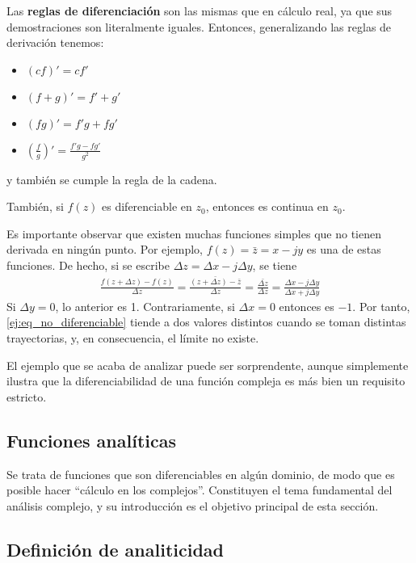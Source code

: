 Las \textbf{reglas de diferenciación} son las mismas que en cálculo real, ya que sus demostraciones son literalmente iguales. Entonces, generalizando las reglas de derivación tenemos:
\begin{itemize}
  \item $(cf)'=cf'$ 
  \item $(f+g)'=f'+g'$
  \item $(fg)'=f'g+fg'$
  \item $\left(\frac{f}{g}\right)'=\frac{f'g-fg'}{g^2}$
\end{itemize}
y también se cumple la regla de la cadena.

También, si $f(z)$ es diferenciable en $z_0$, entonces es continua en $z_0$.

\begin{example}
  Es importante observar que existen muchas funciones simples que no tienen derivada en ningún punto. Por ejemplo, $f(z)=\bar{z}=x-jy$ es una de estas funciones. De hecho, si se escribe $\Delta z = \Delta x - j\Delta y$, se tiene 
  \begin{align}
    \frac{f(z+\Delta z) - f(z)}{\Delta z} = \frac{\bar{(z+\Delta z)-\bar{z}}}{\Delta z} = \frac{\bar{\Delta z}}{\Delta z} = \frac{\Delta x - j\Delta y}{\Delta x + j\Delta y}
    \label{ej:eq_no_diferenciable}
  \end{align}
  Si $\Delta y = 0$, lo anterior es 1. Contrariamente, si $\Delta x = 0$ entonces es $-1$. Por tanto, \ref{ej:eq_no_diferenciable} tiende a dos valores distintos cuando se toman distintas trayectorias, y, en consecuencia, el límite no existe.
\end{example}

El ejemplo que se acaba de analizar puede ser sorprendente, aunque simplemente ilustra que la diferenciabilidad de una función compleja es más bien un requisito estricto.

\subsection{Funciones analíticas}

Se trata de funciones que son diferenciables en algún dominio, de modo que es posible hacer ``cálculo en los complejos''. Constituyen el tema fundamental del análisis complejo, y su introducción es el objetivo principal de esta sección. 

\subsection{Definición de analiticidad}

